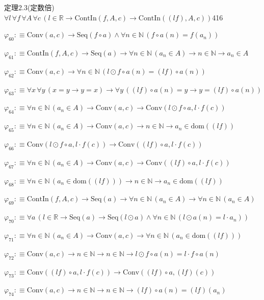 \begin{fullproof}{定理2.3(定数倍)}{$\forall l\,\forall f\,\forall A\,\forall c\,(l \in \mathbb{R} \to \mathrm{ContIn}(f,A,c) \to \mathrm{ContIn}((l f),A,c))$}{416}
\begin{abbrevlist}
\item $\varphi_{60} :\equiv \mathrm{Conv}(a,c) \to \mathrm{Seq}(f \circ a) \land \forall n \in \mathbb{N}\,(f \circ a(n) = f(a_{n}))$
\item $\varphi_{61} :\equiv \mathrm{ContIn}(f,A,c) \to \mathrm{Seq}(a) \to \forall n \in \mathbb{N}\,(a_{n} \in A) \to n \in \mathbb{N} \to a_{n} \in A$
\item $\varphi_{62} :\equiv \mathrm{Conv}(a,c) \to \forall n \in \mathbb{N}\,(l \odot f \circ a(n) = (l f) \circ a(n))$
\item $\varphi_{63} :\equiv \forall x\,\forall y\,(x = y \to y = x) \to \forall y\,((l f) \circ a(n) = y \to y = (l f) \circ a(n))$
\item $\varphi_{64} :\equiv \forall n \in \mathbb{N}\,(a_{n} \in A) \to \mathrm{Conv}(a,c) \to \mathrm{Conv}(l \odot f \circ a,l \cdot f(c))$
\item $\varphi_{65} :\equiv \forall n \in \mathbb{N}\,(a_{n} \in A) \to \mathrm{Conv}(a,c) \to n \in \mathbb{N} \to a_{n} \in \mathrm{dom}((l f))$
\item $\varphi_{66} :\equiv \mathrm{Conv}(l \odot f \circ a,l \cdot f(c)) \to \mathrm{Conv}((l f) \circ a,l \cdot f(c))$
\item $\varphi_{67} :\equiv \forall n \in \mathbb{N}\,(a_{n} \in A) \to \mathrm{Conv}(a,c) \to \mathrm{Conv}((l f) \circ a,l \cdot f(c))$
\item $\varphi_{68} :\equiv \forall n \in \mathbb{N}\,(a_{n} \in \mathrm{dom}((l f))) \to n \in \mathbb{N} \to a_{n} \in \mathrm{dom}((l f))$
\item $\varphi_{69} :\equiv \mathrm{ContIn}(f,A,c) \to \mathrm{Seq}(a) \to \forall n \in \mathbb{N}\,(a_{n} \in A) \to \forall n \in \mathbb{N}\,(a_{n} \in A)$
\item $\varphi_{70} :\equiv \forall a\,(l \in \mathbb{R} \to \mathrm{Seq}(a) \to \mathrm{Seq}(l \odot a) \land \forall n \in \mathbb{N}\,(l \odot a(n) = l \cdot a_{n}))$
\item $\varphi_{71} :\equiv \forall n \in \mathbb{N}\,(a_{n} \in A) \to \mathrm{Conv}(a,c) \to \forall n \in \mathbb{N}\,(a_{n} \in \mathrm{dom}((l f)))$
\item $\varphi_{72} :\equiv \mathrm{Conv}(a,c) \to n \in \mathbb{N} \to n \in \mathbb{N} \to l \odot f \circ a(n) = l \cdot f \circ a(n)$
\item $\varphi_{73} :\equiv \mathrm{Conv}((l f) \circ a,l \cdot f(c)) \to \mathrm{Conv}((l f) \circ a,(l f)(c))$
\item $\varphi_{74} :\equiv \mathrm{Conv}(a,c) \to n \in \mathbb{N} \to n \in \mathbb{N} \to (l f) \circ a(n) = (l f)(a_{n})$

\end{abbrevlist}
\end{fullproof}
